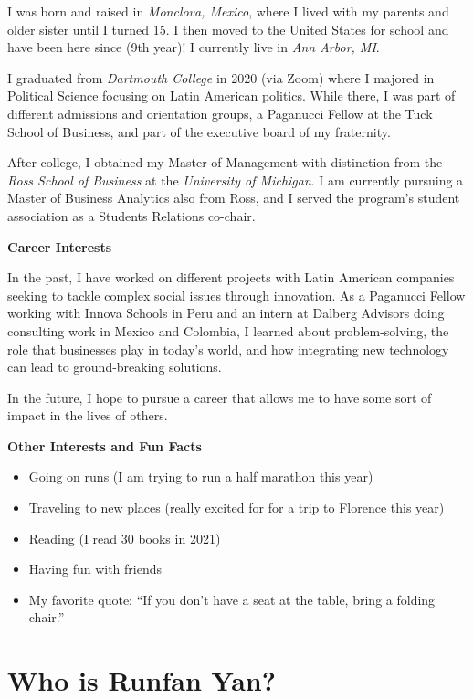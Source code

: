 \documentclass[
]{book}
\begin{document}
I was born and raised in \emph{Monclova, Mexico}, where I lived with my parents and older sister until I turned 15. I then moved to the United States for school and have been here since (9th year)! I currently live in \emph{Ann Arbor, MI}.

I graduated from \emph{Dartmouth College} in 2020 (via Zoom) where I majored in Political Science focusing on Latin American politics. While there, I was part of different admissions and orientation groups, a Paganucci Fellow at the Tuck School of Business, and part of the executive board of my fraternity.

After college, I obtained my Master of Management with distinction from the \emph{Ross School of Business} at the \emph{University of Michigan}. I am currently pursuing a Master of Business Analytics also from Ross, and I served the program's student association as a Students Relations co-chair.

\textbf{Career Interests}

In the past, I have worked on different projects with Latin American companies seeking to tackle complex social issues through innovation. As a Paganucci Fellow working with Innova Schools in Peru and an intern at Dalberg Advisors doing consulting work in Mexico and Colombia, I learned about problem-solving, the role that businesses play in today's world, and how integrating new technology can lead to ground-breaking solutions.

In the future, I hope to pursue a career that allows me to have some sort of impact in the lives of others.

\textbf{Other Interests and Fun Facts}

\begin{itemize}
\item
  Going on runs (I am trying to run a half marathon this year)
\item
  Traveling to new places (really excited for for a trip to Florence this year)
\item
  Reading (I read 30 books in 2021)
\item
  Having fun with friends
\item
  My favorite quote: ``If you don't have a seat at the table, bring a folding chair.''
\end{itemize}

\hypertarget{who-is-runfan-yan}{%
\section{Who is Runfan Yan?}\label{who-is-runfan-yan}}
\end{document}
